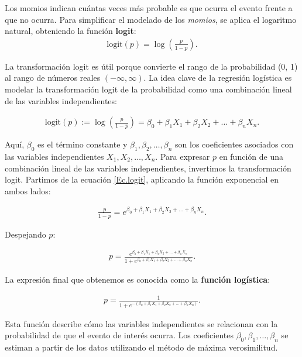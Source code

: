 \documentclass[12pt]{article}
\begin{document}
Los momios indican cuántas veces más probable es que ocurra el evento frente a que no ocurra. Para simplificar el modelado de los \textit{momios}, se aplica el logaritmo natural, obteniendo la función \textbf{logit}:
\begin{eqnarray*}
\text{logit}(p) = \log\left(\frac{p}{1-p}\right).
\end{eqnarray*}

La transformación logit es útil porque convierte el rango de la probabilidad (0, 1) al rango de números reales $\left(-\infty, \infty\right)$. La idea clave de la regresión logística es modelar la transformación logit de la probabilidad como una combinación lineal de las variables independientes:

\begin{eqnarray*}%
\text{logit}(p) := \log\left(\frac{p}{1-p}\right) = \beta_0 + \beta_1 X_1 + \beta_2 X_2 + \ldots + \beta_n X_n.
\end{eqnarray*}

Aquí, $\beta_0$ es el t\'ermino constante y $\beta_1, \beta_2, \ldots, \beta_n$ son los coeficientes asociados con las variables independientes $X_1, X_2, \ldots, X_n$. Para expresar $p$ en función de una combinación lineal de las variables independientes, invertimos la transformación logit. Partimos de la ecuación \ref{Ec.logit}, aplicando la funci\'on exponencial en ambos lados:

\begin{eqnarray*}
\frac{p}{1-p} = e^{\beta_0 + \beta_1 X_1 + \beta_2 X_2 + \ldots + \beta_n X_n}.
\end{eqnarray*}

Despejando $p$:

\begin{eqnarray*}
p = \frac{e^{\beta_0 + \beta_1 X_1 + \beta_2 X_2 + \ldots + \beta_n X_n}}{1 + e^{\beta_0 + \beta_1 X_1 + \beta_2 X_2 + \ldots + \beta_n X_n}}.
\end{eqnarray*}

La expresión final que obtenemos es conocida como la \textbf{función logística}:

\begin{eqnarray*}%
p = \frac{1}{1 + e^{-\left(\beta_0 + \beta_1 X_1 + \beta_2 X_2 + \ldots + \beta_n X_n\right)}}.
\end{eqnarray*}

Esta función describe cómo las variables independientes se relacionan con la probabilidad de que el evento de interés ocurra. Los coeficientes $\beta_0, \beta_1, \ldots, \beta_n$ se estiman a partir de los datos utilizando el método de máxima verosimilitud.
\end{document}
